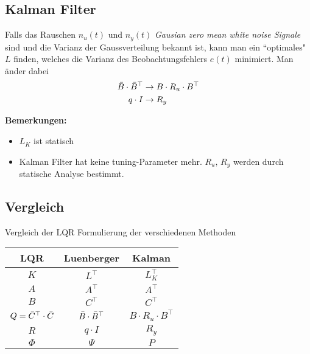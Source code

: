 \subsection{Kalman Filter}
    Falls das Rauschen $n_u(t)$ und $n_y(t)$ \textit{Gausian zero mean white noise Signale} sind und die Varianz der Gaussverteilung bekannt ist, kann man ein ``optimales" $L$ finden, welches die Varianz des Beobachtungsfehlers $e(t)$ minimiert. Man änder dabei
    \begin{align*}
        \Bar{B}\cdot\Bar{B}^\top &\rightarrow B\cdot R_u \cdot B^\top\\
        q\cdot I &\rightarrow R_y
    \end{align*}
    
    \textbf{Bemerkungen:}
    \begin{itemize}
        \item $L_K$ ist statisch
        \item Kalman Filter hat keine tuning-Parameter mehr. $R_u,\, R_y$ werden durch statische Analyse bestimmt.
    \end{itemize}
    
    \subsection{Vergleich}
        Vergleich der LQR Formulierung der verschiedenen Methoden
        \begin{center}
            {\renewcommand{\arraystretch}{1.4}
            \begin{tabular}{c|c|c}
                LQR &   Luenberger  &   Kalman  \\
                \hline
                $K$ &   $L^\top$    &   $L^\top_K$\\
                \hline
                $A$ &   $A^\top$    &   $A^\top$\\
                $B$ &   $C^\top$    &   $C^\top$\\
                $Q = \Bar{C}^\top\cdot\Bar{C}$  &   $\Bar{B}\cdot\Bar{B}^\top$    &   $B\cdot R_u  \cdot B^\top$\\
                $R$ & $q\cdot I$    &   $R_y$\\
                $\Phi$ & $\Psi$     &   $P$
            \end{tabular}
            }
        \end{center}